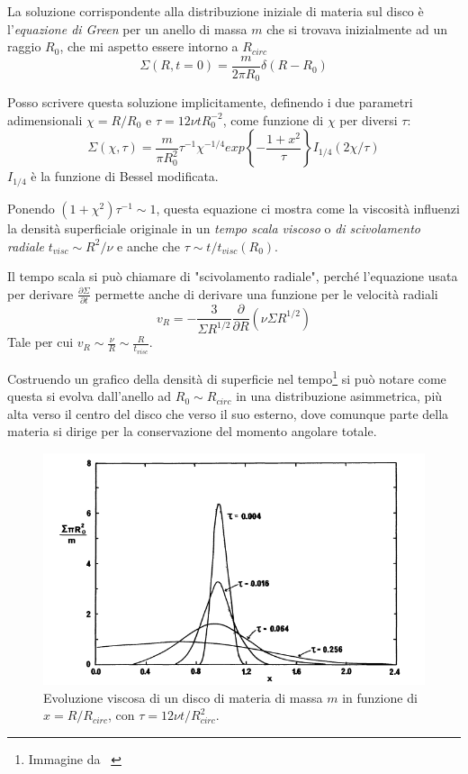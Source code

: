 \documentclass[a4paperbi]{article}
\begin{document}
	La soluzione corrispondente alla distribuzione iniziale di materia sul disco è l'\textit{equazione di Green} per un anello di massa $m$ che si trovava inizialmente ad un raggio $R_0$, che mi aspetto essere intorno a $R_{circ}$
	\begin{equation}
		\Sigma(R,t=0)=\frac{m}{2\pi R_0}\delta(R-R_0)
	\end{equation}
	
	Posso scrivere questa soluzione implicitamente, definendo i due parametri adimensionali $\chi=R/R_0$ e $\tau=12\nu tR_0^{-2}$, come funzione di $\chi$ per diversi $\tau$:
	\begin{equation}
	\Sigma(\chi,\tau)=\frac{m}{\pi R_0^2}\tau^{-1}\chi^{-1/4}exp\left\{-\frac{1+x^2}{\tau}\right\}I_{1/4}(2\chi/\tau)
	\end{equation}
	$I_{1/4}$ è la funzione di Bessel modificata.
	
	Ponendo $(1+\chi^2)\tau^{-1}\sim 1$, questa equazione ci mostra come la viscosità influenzi la densità superficiale originale in un \textit{tempo scala viscoso} o \textit{di scivolamento radiale} $t_{visc}\sim R^2/\nu$ e anche che $\tau\sim t/t_{visc}(R_0)$.
	
	Il tempo scala si può chiamare di "scivolamento radiale", perché l'equazione usata per derivare $\frac{\partial\Sigma}{\partial t}$ permette anche di derivare una funzione per le velocità radiali
	\begin{equation}
		v_R=-\frac{3}{\Sigma R^{1/2}}\frac{\partial}{\partial R}(\nu\Sigma R^{1/2})
	\end{equation}
	Tale per cui $v_R\sim\frac{\nu}{R}\sim\frac{R}{t_{visc}}$.
	
	Costruendo un grafico della densità di superficie nel tempo\footnote{Immagine da ~\cite{Pringle1981}} si può notare come questa si evolva dall'anello ad $R_0\sim R_{circ}$ in una distribuzione asimmetrica, più alta verso il centro del disco che verso il suo esterno, dove comunque parte della materia si dirige per la conservazione del momento angolare totale.
	
	\begin{figure}[H]
		\centering
		\includegraphics[width=0.7\linewidth]{DensSuper}
		\caption{Evoluzione viscosa di un disco di materia di massa $m$ in funzione di $x=R/R_{circ}$, con $\tau=12\nu t/R_{circ}^2$.}
		\label{fig:denssuper}
	\end{figure}
\end{document}
